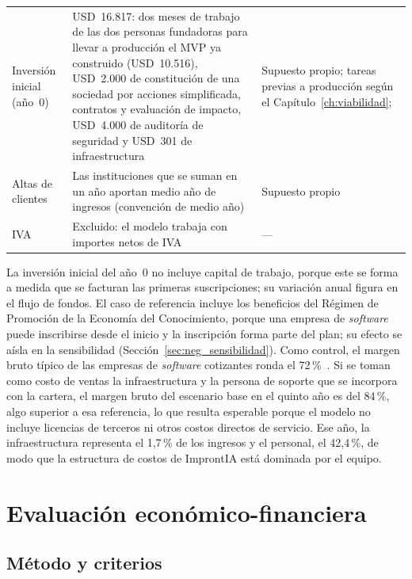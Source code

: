 {\begin{longtable}{>{\raggedright\arraybackslash}p{3.6cm} >{\raggedright\arraybackslash}p{6.6cm} >{\raggedright\arraybackslash}p{4.1cm}}
    Inversión inicial (año~0) & USD~16.817: dos meses de trabajo de las dos personas fundadoras para llevar a producción el MVP ya construido (USD~10.516), USD~2.000 de constitución de una sociedad por acciones simplificada, contratos y evaluación de impacto, USD~4.000 de auditoría de seguridad y USD~301 de infraestructura & Supuesto propio; tareas previas a producción según el Capítulo~\ref{ch:viabilidad}; \textcite{Argentina2017Ley27349} \\
    Altas de clientes & Las instituciones que se suman en un año aportan medio año de ingresos (convención de medio año) & Supuesto propio \\
    IVA & Excluido: el modelo trabaja con importes netos de IVA & --- \\
\end{longtable}
}

La inversión inicial del año~0 no incluye capital de trabajo, porque este se forma a medida que se facturan las primeras suscripciones; su variación anual figura en el flujo de fondos. El caso de referencia incluye los beneficios del Régimen de Promoción de la Economía del Conocimiento, porque una empresa de \textit{software} puede inscribirse desde el inicio y la inscripción forma parte del plan; su efecto se aísla en la sensibilidad (Sección~\ref{sec:neg_sensibilidad}). Como control, el margen bruto típico de las empresas de \textit{software} cotizantes ronda el 72\,\%~\parencite{Damodaran2026Margins}. Si se toman como costo de ventas la infraestructura y la persona de soporte que se incorpora con la cartera, el margen bruto del escenario base en el quinto año es del 84\,\%, algo superior a esa referencia, lo que resulta esperable porque el modelo no incluye licencias de terceros ni otros costos directos de servicio. Ese año, la infraestructura representa el 1,7\,\% de los ingresos y el personal, el 42,4\,\%, de modo que la estructura de costos de ImprontIA está dominada por el equipo.

\section{Evaluación económico-financiera}
\label{sec:neg_evaluacion}

\subsection{Método y criterios}

